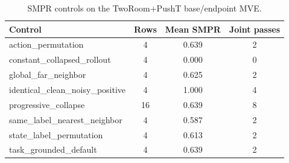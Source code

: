 \begin{table}[H]
\centering
\caption{SMPR controls on the TwoRoom+PushT base/endpoint MVE.}
\label{tab:smpr-controls}
\begin{tabular}{lccc}
\toprule
Control & Rows & Mean SMPR & Joint passes \\
\midrule
action\_permutation & 4 & 0.639 & 2 \\
constant\_collapsed\_rollout & 4 & 0.000 & 0 \\
global\_far\_neighbor & 4 & 0.625 & 2 \\
identical\_clean\_noisy\_positive & 4 & 1.000 & 4 \\
progressive\_collapse & 16 & 0.639 & 8 \\
same\_label\_nearest\_neighbor & 4 & 0.587 & 2 \\
state\_label\_permutation & 4 & 0.613 & 2 \\
task\_grounded\_default & 4 & 0.639 & 2 \\
\bottomrule
\end{tabular}
\end{table}
